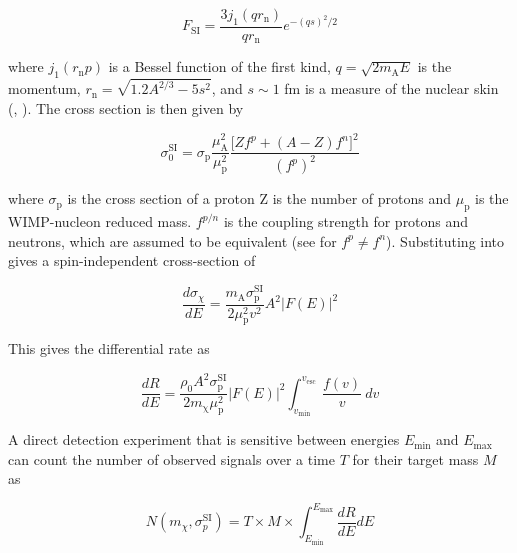 \begin{equation}
F_{\mathrm{SI}} = \frac{3 j_{1}(qr_{\mathrm{n}})}{qr_{\mathrm{n}}} e^{-(qs)^{2}/2}
\end{equation}

\noindent where $j_1(r_{\mathrm{n}}p)$ is a Bessel function of the first kind, $q = \sqrt{2m_{\mathrm{A}}E}$ is the momentum,
$r_{\mathrm{n}} = \sqrt{1.2A^{2/3} - 5s^{2}}$, and $s \sim 1$ fm is a measure of the nuclear skin (,
).  The cross section is then given by

\begin{equation} \label{eq:sigma_si}
\sigma_{0}^{\mathrm{SI}} = \sigma_{\mathrm{p}} \frac{\mu_{\mathrm{A}}^{2}}{\mu_{\mathrm{p}}^{2}} \frac{\big[ Z f^{p} +
(A - Z) f^{n} \big]^{2}}{(f^{p})^{2}}
\end{equation}

\noindent where $\sigma_{\mathrm{p}}$ is the cross section of a proton Z is the number of protons and $\mu_{\mathrm{p}}$ is
the WIMP-nucleon reduced mass. $f^{p/n}$ is the coupling strength for protons and neutrons, which are assumed to be
equivalent (see  for $f^{p} \neq f^{n}$).  Substituting  into 
gives a spin-independent cross-section of

\begin{equation}
\frac{d \sigma_{\chi}}{dE} = \frac{m_{\mathrm{A}} \sigma_{\mathrm{p}}^{\mathrm{SI}}}{2 \mu_{\mathrm{p}}^{2} v^{2}}
 A^{2} \big| F(E) \big |^{2}
\end{equation}

\noindent This gives the differential rate as 

\begin{equation}
\frac{dR}{dE} = \frac{\rho_{0} A^{2} \sigma_{\mathrm{p}}^{\mathrm{SI}}}{2 m_{\mathrm{\chi}} \mu_{\mathrm{p}}^{2}}
  \big| F(E) \big |^{2} \int_{v_{\mathrm{min}}}^{v_{\mathrm{esc}}}
\frac{f(v)}{v}\ dv
\label{eq:dr_de_final}
\end{equation}

\noindent A direct detection experiment that is sensitive between energies $E_{\mathrm{min}}$ and $E_{\mathrm{max}}$ can count the number
of observed signals over a time $T$ for their target mass $M$ as

\begin{equation} \label{eq:counts}
N ( m_{\chi}, \sigma_{p}^{\mathrm{SI}}) = T \times M \times \int_{E_{\mathrm{min}}}^{E_{\mathrm{max}}} \frac{dR}{dE} dE
\end{equation}

